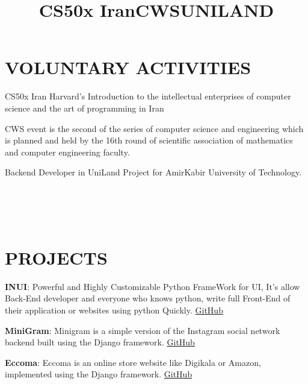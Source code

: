 \documentclass[margin]{res}
\begin{document}
\begin{resume}
\section{VOLUNTARY ACTIVITIES}
\par

\title{\textbf{CS50x Iran}}
\begin{position}
CS50x Iran Harvard's Introduction to the intellectual enterprises of computer science and the art of programming in Iran
\end{position}

\title{\textbf{CWS}}
\begin{position}
CWS event is the second of the series of computer science and engineering which is planned and held by the 16th round of scientific association of mathematics and computer engineering faculty.
\end{position}
\title{\textbf{UNILAND}}
\begin{position}
Backend Developer in UniLand Project for AmirKabir University of Technology.
\end{position}
\\
\\
\\
\section{PROJECTS}
\par
\textbf{INUI}: 
Powerful and Highly Customizable Python FrameWork for UI, It's allow Back-End developer and everyone who knows python, write full Front-End of their application or websites using python Quickly.
\hfill \href{https://github.com/MohammadrezaAmani/INUI}{GitHub}

\par
\textbf{MiniGram}: 
Minigram is a simple version of the Instagram social network backend built using the Django framework.
\hfill \href{https://github.com/MohammadrezaAmani/Minigram}{GitHub}

\par
\textbf{Eccoma}: 
Eccoma is an online store website like Digikala or Amazon, implemented using the Django framework.
\hfill \href{https://github.com/MohammadrezaAmani/Eccoma}{GitHub}


\end{resume}
\end{document}
